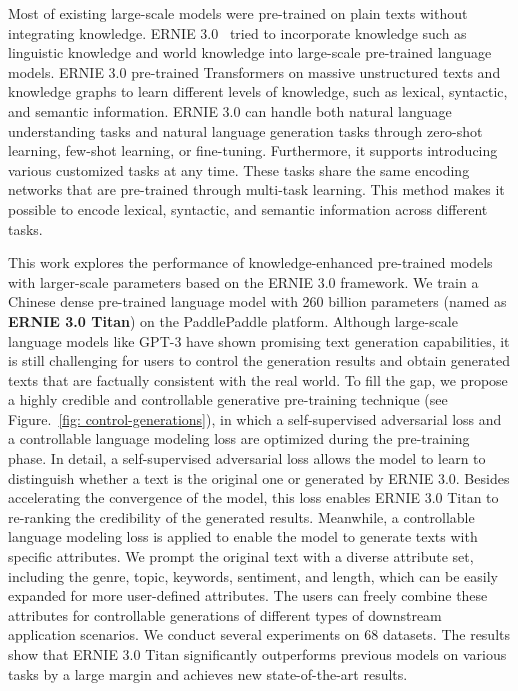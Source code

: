 Most of existing large-scale models were pre-trained on plain texts without integrating knowledge. ERNIE 3.0~\cite{sun2021ernie} tried to incorporate knowledge such as linguistic knowledge and world knowledge into large-scale pre-trained language models. ERNIE 3.0 pre-trained Transformers on massive unstructured texts and knowledge graphs to learn different levels of knowledge, such as lexical, syntactic, and semantic information. ERNIE 3.0 can handle both natural language understanding tasks and natural language generation tasks through zero-shot learning, few-shot learning, or fine-tuning. Furthermore, it supports introducing various customized tasks at any time. These tasks share the same encoding networks that are pre-trained through multi-task learning. This method makes it possible to encode lexical, syntactic, and semantic information across different tasks.

This work explores the performance of knowledge-enhanced pre-trained models with larger-scale parameters based on the ERNIE 3.0 framework. We train a Chinese dense pre-trained language model with 260 billion parameters (named as \textbf{ERNIE 3.0 Titan}) on the PaddlePaddle platform. Although large-scale language models like GPT-3 have shown promising text generation capabilities, it is still challenging for users to control the generation results and obtain generated texts that are factually consistent with the real world. To fill the gap, we propose a highly credible and controllable generative pre-training technique (see Figure.~\ref{fig: control-generations}), in which a self-supervised adversarial loss and a controllable language modeling loss are optimized during the pre-training phase. In detail, a self-supervised adversarial loss allows the model to learn to distinguish whether a text is the original one or generated by ERNIE 3.0. Besides accelerating the convergence of the model, this loss enables ERNIE 3.0 Titan to re-ranking the credibility of the generated results. Meanwhile, a controllable language modeling loss is applied to enable the model to generate texts with specific attributes. We prompt the original text with a diverse attribute set, including the genre, topic, keywords, sentiment, and length, which can be easily expanded for more user-defined attributes. The users can freely combine these attributes for controllable generations of different types of downstream application scenarios. We conduct several experiments on 68 datasets. The results show that ERNIE 3.0 Titan significantly outperforms previous models on various tasks by a large margin and achieves new state-of-the-art results.

